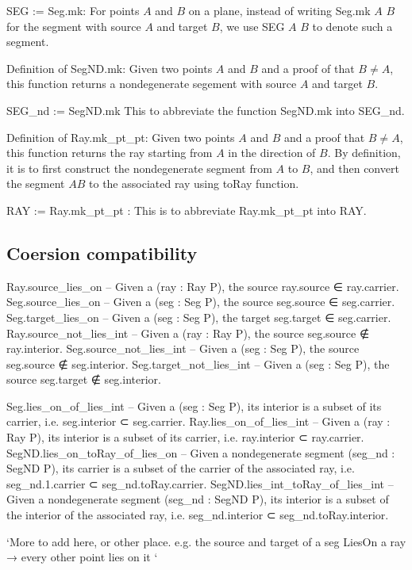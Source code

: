 \documentclass[12pt,a4paper]{article}
\begin{document}
SEG := Seg.mk: For points $A$ and $B$ on a plane, instead of writing Seg.mk $A$ $B$ for the segment with source $A$ and target $B$, we use SEG $A$ $B$ to denote such a segment.

Definition of SegND.mk: Given two points $A$ and $B$ and a proof of that $B \neq A$, this function returns a nondegenerate segement with source $A$ and target $B$.

SEG_nd := SegND.mk This to abbreviate the function SegND.mk into SEG_nd.

Definition of Ray.mk_pt_pt: Given two points $A$ and $B$ and a proof that $B \neq A$, this function returns the ray starting from $A$ in the direction of $B$. By definition, it is to first construct the nondegenerate segment from $A$ to $B$, and then convert the segment $AB$ to the associated ray using toRay function.

RAY := Ray.mk_pt_pt : This is to abbreviate Ray.mk_pt_pt into RAY.

\subsection{Coersion compatibility}

    Ray.source_lies_on -- Given a (ray : Ray P), the source ray.source ∈ ray.carrier.
    Seg.source_lies_on -- Given a (seg : Seg P), the source seg.source ∈ seg.carrier.
    Seg.target_lies_on -- Given a (seg : Seg P), the target seg.target ∈ seg.carrier.
    Ray.source_not_lies_int -- Given a (ray : Ray P), the source seg.source ∉ ray.interior.
    Seg.source_not_lies_int -- Given a (seg : Seg P), the source seg.source ∉ seg.interior.
    Seg.target_not_lies_int -- Given a (seg : Seg P), the source seg.target ∉ seg.interior.

    Seg.lies_on_of_lies_int -- Given a (seg : Seg P), its interior is a subset of its carrier, i.e. seg.interior ⊂ seg.carrier.
    Ray.lies_on_of_lies_int -- Given a (ray : Ray P), its interior is a subset of its carrier, i.e. ray.interior ⊂ ray.carrier.
    SegND.lies_on_toRay_of_lies_on -- Given a nondegenerate segment (seg_nd : SegND P), its carrier is a subset of the carrier of the associated ray, i.e. seg_nd.1.carrier ⊂ seg_nd.toRay.carrier.
    SegND.lies_int_toRay_of_lies_int -- Given a nondegenerate segment (seg_nd : SegND P), its interior is a subset of the interior of the associated ray, i.e. seg_nd.interior ⊂ seg_nd.toRay.interior.

    `More to add here, or other place. e.g. the source and target of a seg LiesOn a ray → every other point lies on it `
\end{document}
